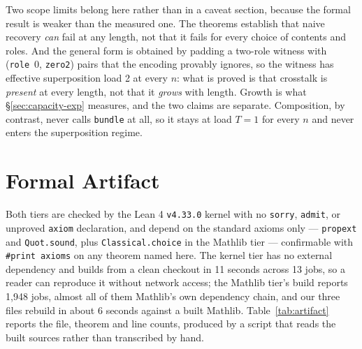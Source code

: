 \documentclass[10pt]{article}
\begin{document}
Two scope limits belong here rather than in a caveat section, because the formal result is weaker than the measured one. The theorems establish that naive recovery \emph{can} fail at any length, not that it fails for every choice of contents and roles. And the general form is obtained by padding a two-role witness with (\texttt{role}~0, \texttt{zero2}) pairs that the encoding provably ignores, so the witness has effective superposition load 2 at every $n$: what is proved is that crosstalk is \emph{present} at every length, not that it \emph{grows} with length. Growth is what \S\ref{sec:capacity-exp} measures, and the two claims are separate. Composition, by contrast, never calls \texttt{bundle} at all, so it stays at load $T = 1$ for every $n$ and never enters the superposition regime.

\section{Formal Artifact}
\label{sec:artifact}

Both tiers are checked by the Lean 4 \texttt{v4.33.0} kernel with no \texttt{sorry}, \texttt{admit}, or unproved \texttt{axiom} declaration, and depend on the standard axioms only --- \texttt{propext} and \texttt{Quot.sound}, plus \texttt{Classical.choice} in the Mathlib tier --- confirmable with \texttt{\#print axioms} on any theorem named here. The kernel tier has no external dependency and builds from a clean checkout in 11 seconds across 13 jobs, so a reader can reproduce it without network access; the Mathlib tier's build reports 1{,}948 jobs, almost all of them Mathlib's own dependency chain, and our three files rebuild in about 6 seconds against a built Mathlib. Table~\ref{tab:artifact} reports the file, theorem and line counts, produced by a script that reads the built sources rather than transcribed by hand.
\end{document}
